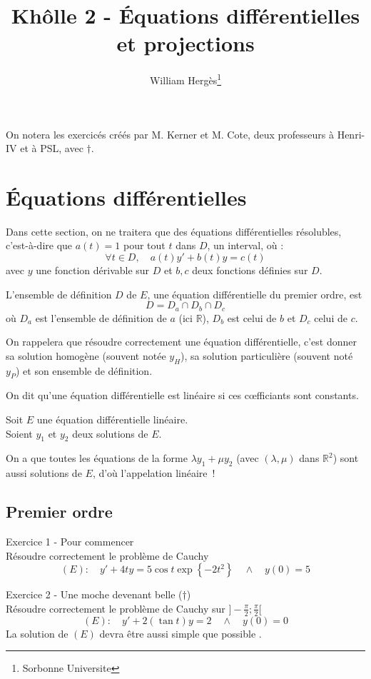 \documentclass[a4paper, titlepage]{article}
\title{Khôlle 2 - Équations différentielles et projections}
\author{William Hergès\thanks{Sorbonne Universite}}
\newenvironment{lititle}%
{\vspace{7mm}\LobsterTwo \large}%
{\\}
\begin{document}
	\maketitle
	\tableofcontents
	\newpage
	On notera les exercicés créés par M. Kerner et M. Cote, deux professeurs à Henri-IV et à PSL, avec $\dagger$.
	\newpage
	\section{Équations différentielles}
	Dans cette section, on ne traitera que des équations différentielles résolubles, c'est-à-dire que $a(t) = 1$ pour tout $t$ dans $D$, un interval, où :
	$$ \forall t\in D,\quad a(t)y'+b(t)y=c(t) $$
	avec $y$ une fonction dérivable sur $D$ et $b,c$ deux fonctions définies sur $D$.

	\begin{props}
		L'ensemble de définition $D$ de $E$, une équation différentielle du premier ordre, est
		$$ D = D_a\cap D_b\cap D_c $$
		où $D_a$ est l'ensemble de définition de $a$ (ici $\mathbb{R}$), $D_b$ est celui de $b$ et $D_c$ celui de $c$.
	\end{props}

	On rappelera que résoudre correctement une équation différentielle, c'est donner sa solution homogène (souvent notée $y_H$), sa solution particulière (souvent noté $y_P$) et son ensemble de définition.
	\begin{defn}
		On dit qu'une équation différentielle est linéaire si ces cœfficiants sont constants.
	\end{defn}
	\begin{props}
		Soit $E$ une équation différentielle linéaire.\\
		Soient $y_1$ et $y_2$ deux solutions de $E$.

		On a que toutes les équations de la forme $\lambda y_1+\mu y_2$ (avec $(\lambda,\mu)$ dans $\mathbb{R}^2$) sont aussi solutions de $E$, d'où l'appelation linéaire~!
	\end{props}
	\subsection{Premier ordre}
	\begin{lititle}
		Exercice 1 - Pour commencer
	\end{lititle}
	Résoudre correctement le problème de Cauchy
	$$ (E):\quad y'+4ty=5\cos t\exp\left\{-2t^2\right\}\quad\land\quad y(0) = 5 $$

	\begin{lititle}
		Exercice 2 - Une moche devenant belle ($\dagger$)
	\end{lititle}
	Résoudre correctement le problème de Cauchy sur $]-\frac{\pi}2;\frac{\pi}2[$
	$$ (E):\quad y'+2(\tan t)y=2\quad\land\quad y(0)=0 $$
	La solution de $(E)$ devra être aussi simple que possible .
\end{document}

